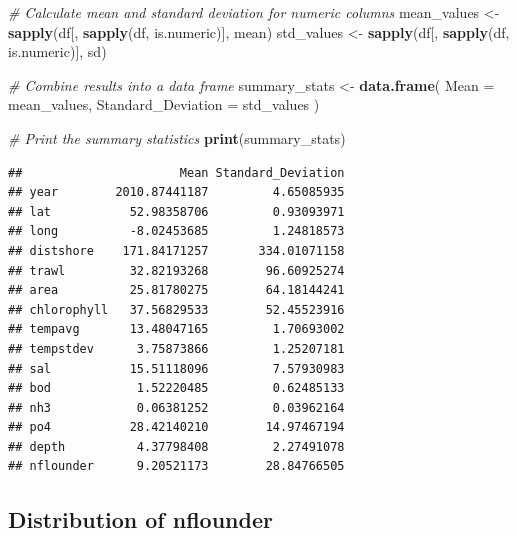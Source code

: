 \documentclass[
]{article}
\newenvironment{Shaded}{\begin{snugshade}}{\end{snugshade}}
\newcommand{\AttributeTok}[1]{\textcolor[rgb]{0.13,0.29,0.53}{#1}}
\newcommand{\CommentTok}[1]{\textcolor[rgb]{0.56,0.35,0.01}{\textit{#1}}}
\newcommand{\FunctionTok}[1]{\textcolor[rgb]{0.13,0.29,0.53}{\textbf{#1}}}
\newcommand{\NormalTok}[1]{#1}
\newcommand{\OtherTok}[1]{\textcolor[rgb]{0.56,0.35,0.01}{#1}}
\newcommand{\SpecialCharTok}[1]{\textcolor[rgb]{0.81,0.36,0.00}{\textbf{#1}}}
\begin{document}
\begin{Shaded}
\begin{Highlighting}[]
\CommentTok{\# Calculate mean and standard deviation for numeric columns}
\NormalTok{mean\_values }\OtherTok{\textless{}{-}} \FunctionTok{sapply}\NormalTok{(df[, }\FunctionTok{sapply}\NormalTok{(df, is.numeric)], mean)}
\NormalTok{std\_values }\OtherTok{\textless{}{-}} \FunctionTok{sapply}\NormalTok{(df[, }\FunctionTok{sapply}\NormalTok{(df, is.numeric)], sd)}

\CommentTok{\# Combine results into a data frame}
\NormalTok{summary\_stats }\OtherTok{\textless{}{-}} \FunctionTok{data.frame}\NormalTok{(}
  \AttributeTok{Mean =}\NormalTok{ mean\_values,}
  \AttributeTok{Standard\_Deviation =}\NormalTok{ std\_values}
\NormalTok{)}

\CommentTok{\# Print the summary statistics}
\FunctionTok{print}\NormalTok{(summary\_stats)}
\end{Highlighting}
\end{Shaded}

\begin{verbatim}
##                      Mean Standard_Deviation
## year        2010.87441187         4.65085935
## lat           52.98358706         0.93093971
## long          -8.02453685         1.24818573
## distshore    171.84171257       334.01071158
## trawl         32.82193268        96.60925274
## area          25.81780275        64.18144241
## chlorophyll   37.56829533        52.45523916
## tempavg       13.48047165         1.70693002
## tempstdev      3.75873866         1.25207181
## sal           15.51118096         7.57930983
## bod            1.52220485         0.62485133
## nh3            0.06381252         0.03962164
## po4           28.42140210        14.97467194
## depth          4.37798408         2.27491078
## nflounder      9.20521173        28.84766505
\end{verbatim}

\subsection{Distribution of nflounder}\label{distribution-of-nflounder}

\begin{Shaded}
\end{Shaded}
\end{document}
